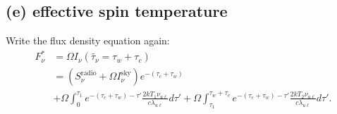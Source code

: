 \documentclass[12pt,letterpaper]{article}
\newcommand{\Isky}{I_\nu^{\textrm{sky}}}
\newcommand{\Snuradio}{S_\nu^{\textrm{radio}}}
\begin{document}
\subsection*{(e) effective spin temperature}
Write the flux density equation again:
\begin{equation}
    \begin{split}
        F_\nu^{*} &= \Omega I_{\nu}(\tilde{\tau_\nu} = \tau_w + \tau_c)\\
        &= (\Snuradio + \Omega\Isky)e^{-(\tau_c + \tau_w)}\\
        &+ 
        \Omega\int_0^{\tau_1} e^{-(\tau_c + \tau_w) - \tau'} 
        \frac{2 k T_{1} \nu_{u \ell}}{c \lambda_{u \ell}} d\tau'
        + 
        \Omega\int_{\tau_1}^{\tau_w + \tau_c} e^{-(\tau_c + \tau_w) - \tau'} 
        \frac{2 k T_{2} \nu_{u \ell}}{c \lambda_{u \ell}} d\tau'.
    \end{split}
\end{equation}
\end{document}
